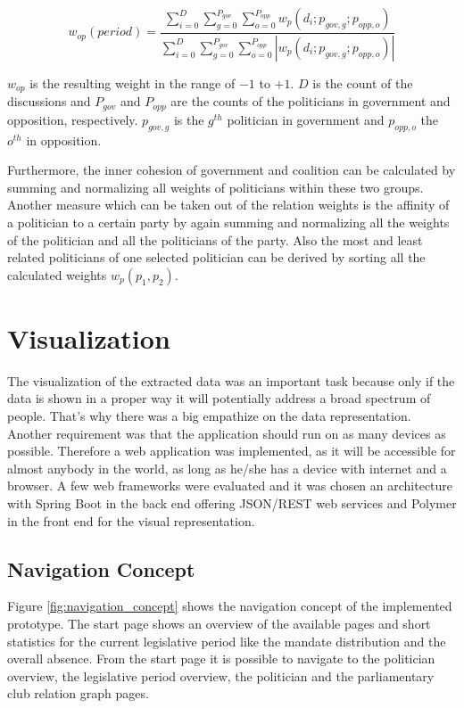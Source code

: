$$
w_{op}(period) = \frac{\displaystyle\sum_{i=0}^{D} \displaystyle\sum_{g=0}^{P_{gov}} \displaystyle\sum_{o=0}^{P_{opp}} w_p(d_i;p_{gov,g};p_{opp,o})}{\displaystyle\sum_{i=0}^{D} \displaystyle\sum_{g=0}^{P_{gov}} \displaystyle\sum_{o=0}^{P_{opp}} |w_p(d_i;p_{gov,g};p_{opp,o})|}
$$

$w_{op}$ is the resulting weight in the range of $-1$ to $+1$. $D$ is the count of the discussions and $P_{gov}$ and $P_{opp}$ are the counts of the politicians in government and opposition, respectively. $p_{gov,g}$ is the $g^{th}$ politician in government and $p_{opp,o}$ the $o^{th}$ in opposition.

Furthermore, the inner cohesion of government and coalition can be calculated by summing and normalizing all weights of politicians within these two groups. Another measure which can be taken out of the relation weights is the affinity of a politician to a certain party by again summing and normalizing all the weights of the politician and all the politicians of the party. Also the most and least related politicians of one selected politician can be derived by sorting all the calculated weights $w_p(p_1,p_2)$.

\section{Visualization}
\label{sec:visualization}
The visualization of the extracted data was an important task because only if the data is shown in a proper way it will potentially address a broad spectrum of people. That's why there was a big empathize on the data representation. Another requirement was that the application should run on as many devices as possible. Therefore a web application was implemented, as it will be accessible for almost anybody in the world, as long as he/she has a device with internet and a browser. A few web frameworks were evaluated and it was chosen an architecture with Spring Boot in the back end offering JSON/REST web services and Polymer in the front end for the visual representation.


\subsection{Navigation Concept}
Figure \ref{fig:navigation_concept} shows the navigation concept of the implemented prototype. The start page shows an overview of the available pages and short statistics for the current legislative period like the mandate distribution and the overall absence. From the start page it is possible to navigate to the politician overview, the legislative period overview, the politician and the parliamentary club relation graph pages. 


